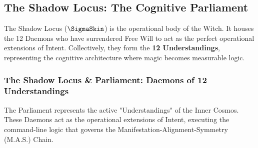 \documentclass[11pt, letterpaper]{article}
\newcommand{\sloig}{\reflectbox{\textnormal{\symbolafont\symbol{"26CE}}}}
\begin{document}
\newpage
\subsection{The Shadow Locus: The Cognitive Parliament}\label{sec:8.3}
The Shadow Locus ($\SigmaSkin$) is the operational body of the Witch. It houses the 12 Daemons who have surrendered Free Will to act as the perfect operational extensions of Intent. Collectively, they form the \textbf{12 Understandings}, representing the cognitive architecture where magic becomes measurable logic.



\subsubsection*{The Shadow Locus \sloig \& Parliament: Daemons of 12 Understandings}\label{sec:8.1.1}
The Parliament represents the active "Understandings" of the Inner Cosmos. These Daemons act as the operational extensions of Intent, executing the command-line logic that governs the Manifestation-Alignment-Symmetry (M.A.S.) Chain.
\end{document}
